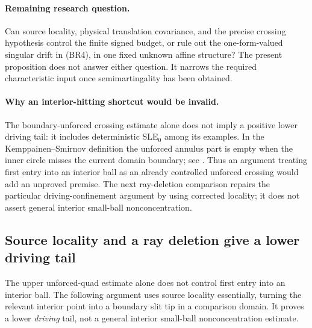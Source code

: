 \documentclass[11pt]{article}
\theoremstyle{definition}\newtheorem{definition}[theorem]{Definition}
\theoremstyle{remark}\newtheorem{remark}[theorem]{Remark}
\begin{document}
\paragraph{Remaining research question.}
Can source locality, physical translation covariance, and the precise
crossing hypothesis control the finite signed budget, or rule out the
one-form-valued singular drift in (BR4), in one fixed unknown affine
structure? The present proposition does not answer either question.
It narrows the required characteristic input once semimartingality
has been obtained.

\paragraph{Why an interior-hitting shortcut would be invalid.}
The boundary-unforced crossing estimate alone does not imply a positive
lower driving tail: it includes deterministic SLE$_0$ among its examples.
In the Kemppainen--Smirnov definition the unforced annulus part is empty
when the inner circle misses the current domain boundary; see
\cite[Definition 2.3 and Section 1.4]{ks}. Thus an argument treating first
entry into an interior ball as an already controlled unforced crossing
would add an unproved premise. The next ray-deletion comparison repairs
the particular driving-confinement argument by using corrected locality;
it does not assert general interior small-ball nonconcentration.

\subsection{Source locality and a ray deletion give a lower driving tail}
\label{sec:locality-ray-lower-tail}

The upper unforced-quad estimate alone does not control first entry
into an interior ball. The following argument uses source locality
essentially, turning the relevant interior point into a boundary slit
tip in a comparison domain. It proves a lower \emph{driving} tail,
not a general interior small-ball nonconcentration estimate.
\end{document}
